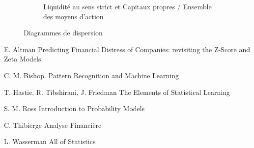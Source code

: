 \documentclass[DIV=calc, paper=a4, fontsize=11pt, twocolumn]{scrartcl}
\begin{document}
\begin{appendices}
\begin{figure}
\begin{subfigure}{.40\textwidth}
    \caption{Liquidité au sens strict et Capitaux propres / Ensemble des moyens d’action}
  \end{subfigure}
\caption{Diagrammes de dispersion}
\end{figure}

\end{appendices}

\twocolumn
\begin{thebibliography}{99} 
E. Altman
\newblock Predicting Financial Distress of Companies: revisiting the Z-Score and Zeta Models.

C. M. Bishop.
\newblock Pattern Recognition and Machine Learning

T. Hastie, R. Tibshirani, J. Friedman
\newblock The Elements of Statistical Learning

S. M. Ross
\newblock Introduction to Probability Models

C. Thibierge
\newblock Analyse Financière

L. Wasserman
\newblock All of Statistics
\end{thebibliography}
\end{document}
